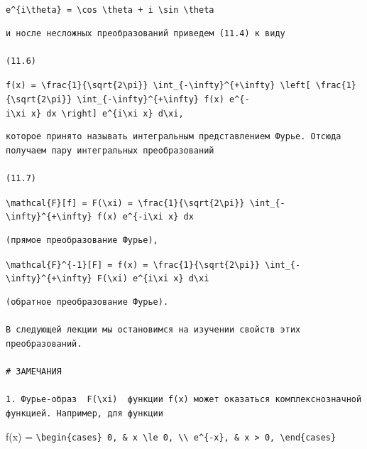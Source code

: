\documentclass[
  ukrainian,
]{article}
\begin{document}
\texttt{e\^{}\{i\textbackslash{}theta\}\ =\ \textbackslash{}cos\ \textbackslash{}theta\ +\ i\ \textbackslash{}sin\ \textbackslash{}theta}

\begin{verbatim}
и носле несложных преобразований приведем (11.4) к виду

(11.6)
\end{verbatim}

\texttt{f(x)\ =\ \textbackslash{}frac\{1\}\{\textbackslash{}sqrt\{2\textbackslash{}pi\}\}\ \textbackslash{}int\_\{-\textbackslash{}infty\}\^{}\{+\textbackslash{}infty\}\ \textbackslash{}left{[}\ \textbackslash{}frac\{1\}\{\textbackslash{}sqrt\{2\textbackslash{}pi\}\}\ \textbackslash{}int\_\{-\textbackslash{}infty\}\^{}\{+\textbackslash{}infty\}\ f(x)\ e\^{}\{-i\textbackslash{}xi\ x\}\ dx\ \textbackslash{}right{]}\ e\^{}\{i\textbackslash{}xi\ x\}\ d\textbackslash{}xi,}

\begin{verbatim}
которое принято называть интегральным представлением Фурье. Отсюда получаем пару интегральных преобразований

(11.7)
\end{verbatim}

\texttt{\textbackslash{}mathcal\{F\}{[}f{]}\ =\ F(\textbackslash{}xi)\ =\ \textbackslash{}frac\{1\}\{\textbackslash{}sqrt\{2\textbackslash{}pi\}\}\ \textbackslash{}int\_\{-\textbackslash{}infty\}\^{}\{+\textbackslash{}infty\}\ f(x)\ e\^{}\{-i\textbackslash{}xi\ x\}\ dx}

\begin{verbatim}
(прямое преобразование Фурье),
\end{verbatim}

\texttt{\textbackslash{}mathcal\{F\}\^{}\{-1\}{[}F{]}\ =\ f(x)\ =\ \textbackslash{}frac\{1\}\{\textbackslash{}sqrt\{2\textbackslash{}pi\}\}\ \textbackslash{}int\_\{-\textbackslash{}infty\}\^{}\{+\textbackslash{}infty\}\ F(\textbackslash{}xi)\ e\^{}\{i\textbackslash{}xi\ x\}\ d\textbackslash{}xi}

\begin{verbatim}
(обратное преобразование Фурье).

В следующей лекции мы остановимся на изучении свойств этих преобразований.

# ЗАМЕЧАНИЯ

1. Фурье-образ  F(\xi)  функции f(x) может оказаться комплекснозначной функцией. Например, для функции
\end{verbatim}

f(x) =
\texttt{\textbackslash{}begin\{cases\}\ 0,\ \&\ x\ \textbackslash{}le\ 0,\ \textbackslash{}\textbackslash{}\ e\^{}\{-x\},\ \&\ x\ \textgreater{}\ 0,\ \textbackslash{}end\{cases\}}
\end{document}
